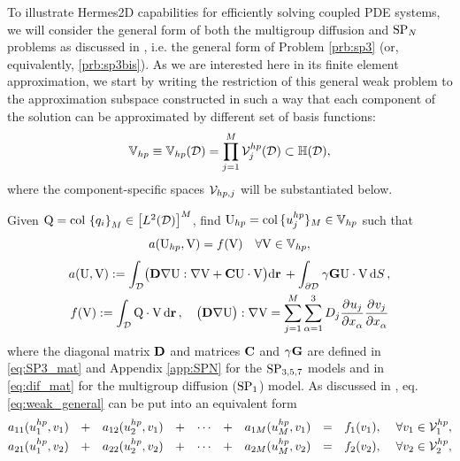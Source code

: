 To illustrate Hermes2D capabilities for efficiently solving coupled PDE systems, we will consider the general form of
both the multigroup diffusion and $\SPN$ problems as discussed in , i.e. the general form of Problem
\ref{prb:sp3} (or, equivalently, \ref{prb:sp3bis}). As we are interested here in its finite element approximation, we
start by writing the restriction of this general weak problem to the approximation subspace constructed in such a
way that each component of the solution can be approximated by different set of basis functions:
$$ 
	\mathbb{V}_{hp} \equiv \mathbb{V}_{hp}(\VV) = \prod_{j=1}^M \Space_{j}^{hp}(\VV) \subset \mathbb{H}(\VV),
$$
where the component-specific spaces $\Space_{hp,j}$ will be substantiated below. 
\begin{problem}\label{prb:dif}
Given $\mathrm{Q} = \colset{q_i}{M} \in \left[\Lp[2](\VV)\right]^M$, find $\U_{hp} = \col \{u_{j}^{hp}\}_M \in
\mathbb{V}_{hp}$ such that
\begin{equation}\label{eq:weak_general}
\begin{gathered}
	a(\U_{hp}, \mathrm{V}) = f(\mathrm{V}) \quad \forall \mathrm{V}\in \mathbb{V}_{hp},\\[.3em]
	a(\mathrm{U}, \mathrm{V}) := \int_{\VV} \bigl(\mat{D}\nabla\mathrm{U} : \nabla \mathrm{V} +
	\mat{C} \mathrm{U}\cdot\mathrm{V}\bigr)\d{\br} +  \int_{\pV} \gamma\mat{G}\mathrm{U}\cdot\mathrm{V}
	\,\d{S},\\
 	f(\mathrm{V}) := \int_{\VV}\mathrm{Q}\cdot\mathrm{V}\,\d{\br},\quad \bigl(\mat{D}\nabla\mathrm{U}\bigr) : \nabla
 	\mathrm{V} = \sum_{j=1}^M\sum_{\alpha=1}^3 D_j\pd{u_j}{x_\alpha}\pd{v_j}{x_\alpha}
\end{gathered}
\end{equation}
where the diagonal matrix $\mat{D}$ and matrices $\mat{C}$ and $\gamma\mat{G}$ are defined in \eqref{eq:SP3_mat} and
Appendix \ref{app:SPN} for the  $\SPN[3,5,7]$ models and in \eqref{eq:dif_mat} for the multigroup diffusion ($\SPN[1]$)
model. As discussed in , eq. \eqref{eq:weak_general} can be put into an equivalent form \\[.2em]
\begin{equation*}
\begin{matrix}
		\a{1}{1} 	& + & \b{1}{2} 	& + & \cdots 	& + & \b{1}{M} 	& = & \l[1], &\ \forall v_1\in \Space_{1}^{hp}, \\[.25em]
		\b{2}{1} 	& + & \a{2}{2} 	& + & \cdots 	& + & \b{2}{M} 	& = & \l[2], &\ \forall v_2\in \Space_{2}^{hp}, \\[.25em]

\end{matrix}
\end{equation*}
\end{problem}

